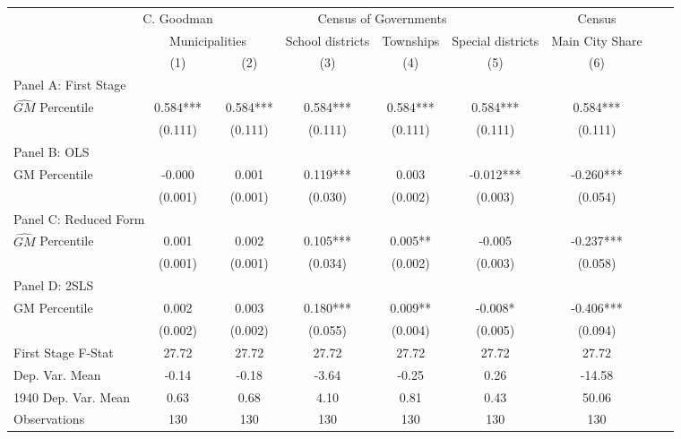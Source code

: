  \begin{tabular}{l*{8}{c}} \toprule
&\multicolumn{1}{c}{C. Goodman}&\multicolumn{4}{c}{Census of Governments}&\multicolumn{1}{c}{Census}\\\cmidrule(lr){2-2}\cmidrule(lr){3-6}\cmidrule(lr){7-7}
&\multicolumn{2}{c}{Municipalities}&\multicolumn{1}{c}{School districts}&\multicolumn{1}{c}{Townships}&\multicolumn{1}{c}{Special districts}&\multicolumn{1}{c}{Main City Share}\\\cmidrule(lr){2-3}\cmidrule(lr){4-6}\cmidrule(lr){7-7}
&\multicolumn{1}{c}{(1)}&\multicolumn{1}{c}{(2)}&\multicolumn{1}{c}{(3)}&\multicolumn{1}{c}{(4)}&\multicolumn{1}{c}{(5)}&\multicolumn{1}{c}{(6)}\\
\cmidrule(lr){1-7}
\multicolumn{6}{l}{Panel A: First Stage}\\
\cmidrule(lr){1-7}
$\widehat{GM}$ Percentile&    0.584***&    0.584***&    0.584***&    0.584***&    0.584***&    0.584***\\
                &  (0.111)   &  (0.111)   &  (0.111)   &  (0.111)   &  (0.111)   &  (0.111)   \\
\cmidrule(lr){1-7}
\multicolumn{6}{l}{Panel B: OLS}\\
\cmidrule(lr){1-7}
GM Percentile   &   -0.000   &    0.001   &    0.119***&    0.003   &   -0.012***&   -0.260***\\
                &  (0.001)   &  (0.001)   &  (0.030)   &  (0.002)   &  (0.003)   &  (0.054)   \\
\cmidrule(lr){1-7}
\multicolumn{6}{l}{Panel C: Reduced Form}\\
\cmidrule(lr){1-7}
$\widehat{GM}$ Percentile&    0.001   &    0.002   &    0.105***&    0.005** &   -0.005   &   -0.237***\\
                &  (0.001)   &  (0.001)   &  (0.034)   &  (0.002)   &  (0.003)   &  (0.058)   \\
\cmidrule(lr){1-7}
\multicolumn{6}{l}{Panel D: 2SLS}\\
\cmidrule(lr){1-7}
GM Percentile   &    0.002   &    0.003   &    0.180***&    0.009** &   -0.008*  &   -0.406***\\
                &  (0.002)   &  (0.002)   &  (0.055)   &  (0.004)   &  (0.005)   &  (0.094)   \\
\midrule
First Stage F-Stat&    27.72   &    27.72   &    27.72   &    27.72   &    27.72   &    27.72   \\
Dep. Var. Mean  &    -0.14   &    -0.18   &    -3.64   &    -0.25   &     0.26   &   -14.58   \\
1940 Dep. Var. Mean&     0.63   &     0.68   &     4.10   &     0.81   &     0.43   &    50.06   \\
Observations    &      130   &      130   &      130   &      130   &      130   &      130   \\
       \bottomrule \end{tabular}
